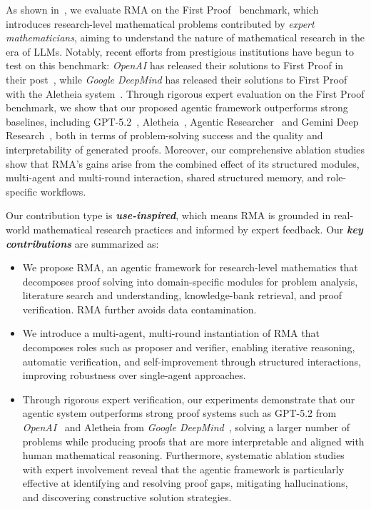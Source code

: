 \documentclass{article}
\newcommand{\modelname}{\textsc{RMA}\xspace}
\newcommand{\OpenAI}{\emph{OpenAI}\xspace}
\newcommand{\GoogleDeepMind}{\emph{Google DeepMind}\xspace}
\begin{document}
As shown in~, we evaluate \modelname on the First Proof~\citep{abouzaid2026first} benchmark, which introduces research-level mathematical problems contributed by \emph{expert mathematicians}, aiming to understand the nature of mathematical research in the era of LLMs. Notably, recent efforts from prestigious institutions have begun to test on this benchmark: \OpenAI has released their solutions to First Proof in their post~\citep{openai_first_proof_2025}, while \GoogleDeepMind has released their solutions to First Proof with the Aletheia system~\citep{aletheia}. Through rigorous expert evaluation on the First Proof benchmark, we show that our proposed agentic framework outperforms strong baselines, including GPT-5.2~\citep{openai_first_proof_2025}, Aletheia~\citep{aletheia}, Agentic Researcher~\citep{zimmer2026agenticresearcherpracticalguide} and Gemini Deep Research~\citep{google_gemini_deep_research_2025}, both in terms of problem-solving success and the quality and interpretability of generated proofs. Moreover, our comprehensive ablation studies show that \modelname's gains arise from the combined effect of its structured modules, multi-agent and multi-round interaction, shared structured memory, and role-specific workflows.

Our contribution type is \textbf{\emph{use-inspired}}, which means \modelname is grounded in real-world mathematical research practices and informed by expert feedback. Our \textbf{\emph{key contributions}} are summarized as:

\begin{itemize}[leftmargin=*]
\item We propose \modelname, an agentic framework for research-level mathematics that decomposes proof solving into domain-specific modules for problem analysis, literature search and understanding, knowledge-bank retrieval, and proof verification. \modelname further avoids data contamination.

\item We introduce a multi-agent, multi-round instantiation of \modelname that decomposes roles such as proposer and verifier, enabling iterative reasoning, automatic verification, and self-improvement through structured interactions, improving robustness over single-agent approaches.

\item Through rigorous expert verification, our experiments demonstrate that our agentic system outperforms strong proof systems such as GPT-5.2 from \OpenAI~\cite{openai_first_proof_2025} and Aletheia from \GoogleDeepMind~\cite{aletheia}, solving a larger number of problems while producing proofs that are more interpretable and aligned with human mathematical reasoning. Furthermore, systematic ablation studies with expert involvement reveal that the agentic framework is particularly effective at identifying and resolving proof gaps, mitigating hallucinations, and discovering constructive solution strategies.
\end{itemize}
\end{document}
